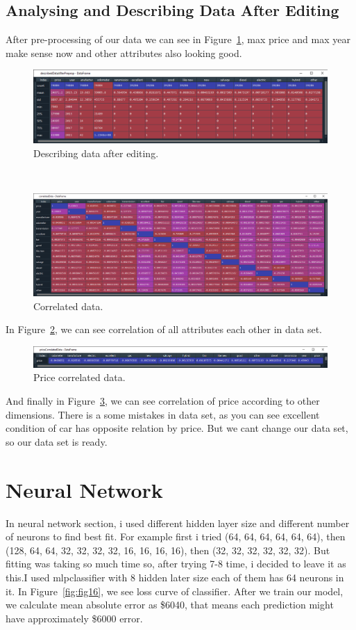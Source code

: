 \documentclass[onecolumn]{article}
\begin{document}
\subsection{Analysing and Describing Data After Editing}
After pre-processing of our data we can see in Figure~\ref{fig:fig13}, max price and max year make sense now and other attributes also looking good.
\\
\begin{figure}[H]
\centering
       \includegraphics[width=.8\linewidth]{figures/Figure13.png}
\caption{\label{fig:fig13}
Describing data after editing.}
\end{figure}
\\
\begin{figure}[H]
\centering
    \includegraphics[width=.8\linewidth]{figures/Figure14.png}
\caption{\label{fig:fig14}
Correlated data.}
\end{figure}

In Figure~\ref{fig:fig14}, we can see correlation of all attributes each other in data set.
\begin{figure}[H]
\centering
    \includegraphics[width=.8\linewidth]{figures/Figure15.png}
\caption{\label{fig:fig15}
Price correlated data.}
\end{figure}
And finally in Figure~\ref{fig:fig15}, we can see correlation of price according to other dimensions. There is a some mistakes in data set, as you can see excellent condition of car has opposite relation by price. But we cant change our data set, so our data set is ready.


\section{Neural Network}
In neural network section, i used different hidden layer size and different number of neurons to find best fit. For example first i tried (64, 64, 64, 64, 64, 64), then (128, 64, 64, 32, 32, 32, 32, 16, 16, 16, 16), then (32, 32, 32, 32, 32, 32). But fitting was taking so much time so, after trying 7-8 time, i decided to leave it as this.I used mlpclassifier with 8 hidden later size each of them has 64 neurons in it. In Figure~\ref{fig:fig16}, we see loss curve of classifier.
After we train our model, we calculate mean absolute error as \$6040, that means each prediction might have approximately \$6000 error.
\end{document}
